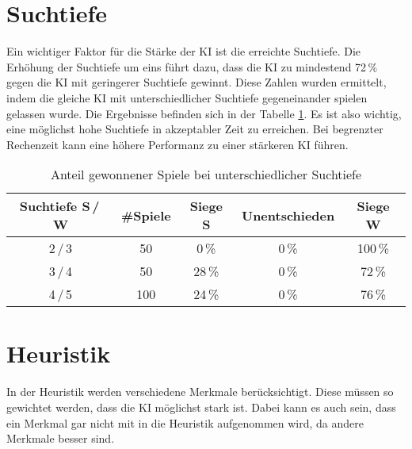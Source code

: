 
\section{Suchtiefe}
Ein wichtiger Faktor für die Stärke der \ac{KI} ist die erreichte Suchtiefe. Die Erhöhung der Suchtiefe um eins führt dazu,
dass die \ac{KI} zu mindestend 72\,\% gegen die \ac{KI} mit geringerer Suchtiefe gewinnt. Diese Zahlen wurden ermittelt, indem die
gleiche \ac{KI} mit unterschiedlicher Suchtiefe gegeneinander spielen gelassen wurde. Die Ergebnisse befinden sich in der
Tabelle \ref{table:search-depth}. Es ist also wichtig, eine möglichst hohe Suchtiefe in akzeptabler Zeit zu erreichen.
Bei begrenzter Rechenzeit kann eine höhere Performanz zu einer stärkeren \ac{KI} führen.

\begin{table}[hb]
\centering
\begin{tabular}{c|c|ccc}
\hline
Suchtiefe S\,/\,W & \#Spiele & Siege S & Unentschieden & Siege W
\\ \hline
2\,/\,3 & 50 &  0\,\% &  0\,\% & 100\,\% \\
3\,/\,4 & 50 & 28\,\% &  0\,\% & 72\,\% \\
4\,/\,5 &100 & 24\,\% &  0\,\% & 76\,\% \\
\hline
\end{tabular}
\caption{Anteil gewonnener Spiele bei unterschiedlicher Suchtiefe}
\label{table:search-depth}
\end{table}

\section{Heuristik}
In der Heuristik werden verschiedene Merkmale berücksichtigt. Diese müssen so gewichtet werden, dass die \ac{KI} möglichst
stark ist. Dabei kann es auch sein, dass ein Merkmal gar nicht mit in die Heuristik aufgenommen wird, da andere Merkmale
besser sind.

